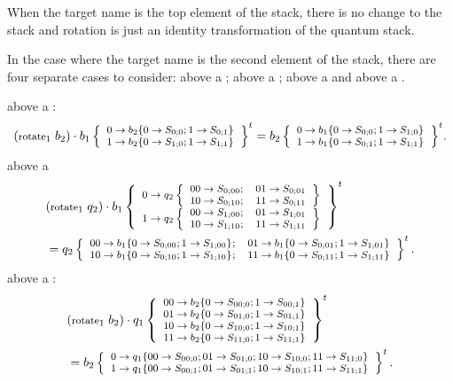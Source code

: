 When the target name is the top element of the stack, there is no 
change to the stack and rotation is just an identity transformation of
the quantum stack.

In the case where the target name is the second element of the stack,
 there are four separate cases  to
consider: \bit{} above a  \bit; \bit{} above a \qbit; 
\qbit{} above a \qbit{} and \qbit{} above a \bit{}.

{\begin{footnotesize}
\begin{singlespace}
\bit{} above a \bit{}:
\begin{equation*}
 \begin{footnotesize}\qop{(\text{rotate}_1\ b_2)}
           {\qsbitUp{b_1}{\qsbit{b_2}{S_{0;0}}{S_{0;1}}{}}%
				{\qsbit{b_2}{S_{1;0}}{S_{1;1}}{}}{t}} =
      {\qsbitUp{b_2}{\qsbit{b_1}{S_{0;0}}{S_{1;0}}{}}%
				{\qsbit{b_1}{S_{0;1}}{S_{1;1}}{}}{t}}.\end{footnotesize}
\end{equation*}
\bit{} above a \qbit{}
\begin{align*}
&\begin{footnotesize} \qop{(\text{rotate}_1\ q_2)}
    {\qsbitUp{b_1}{\qsqbitUp{q_2}{S_{0;00}}{S_{0;01}}{S_{0;10}}{S_{0;11}}{}}%
   {\qsqbitUp{q_2}{S_{1;00}}{S_{1;01}}{S_{1;10}}{S_{1;11}}{}}{t}} \end{footnotesize} \\
&\begin{footnotesize}    = \qsqbitUp{q_2}{\qsbit{b_1}{S_{0;00}}{S_{1;00}}{}}%
         {\qsbit{b_1}{S_{0;01}}{S_{1;01}}{}}%
         {\qsbit{b_1}{S_{0;10}}{S_{1;10}}{}}%
         {\qsbit{b_1}{S_{0;11}}{S_{1;11}}{}}{t}.\end{footnotesize}
\end{align*}
\qbit{} above a \bit{}:
\begin{align*}
&\begin{footnotesize}\qop{(\text{rotate}_1\ b_2)}
{\qsqbitAllUp{q_1}{\qsbit{b_2}{S_{00;0}}{S_{00;1}}{}}%
         {\qsbit{b_2}{S_{01;0}}{S_{01;1}}{}}%
         {\qsbit{b_2}{S_{10;0}}{S_{10;1}}{}}%
         {\qsbit{b_2}{S_{11;0}}{S_{11;1}}{}}{t}} \end{footnotesize} \\
&\begin{footnotesize}=\qsbitUp{b_2}{\qsqbit{q_1}{S_{00;0}}{S_{01;0}}{S_{10;0}}{S_{11;0}}{}}%
   {\qsqbit{q_1}{S_{00;1}}{S_{01;1}}{S_{10;1}}{S_{11;1}}{}}{t}.\end{footnotesize}
\end{align*}

\end{singlespace}
\end{footnotesize}}
